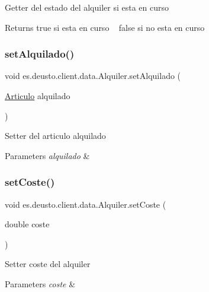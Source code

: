 Getter del estado del alquiler si esta en curso \begin{DoxyReturn}{Returns}
true si esta en curso ~\newline
 false si no esta en curso 
\end{DoxyReturn}
\mbox{\label{classes_1_1deusto_1_1client_1_1data_1_1_alquiler_aba93732bce43b85bb3d48b58f0f7c2de}} 
\subsubsection{\texorpdfstring{setAlquilado()}{setAlquilado()}}
{\footnotesize\ttfamily void es.\+deusto.\+client.\+data.\+Alquiler.\+set\+Alquilado (\begin{DoxyParamCaption}\item[{\mbox{\hyperlink{classes_1_1deusto_1_1client_1_1data_1_1_articulo}{Articulo}}}]{alquilado }\end{DoxyParamCaption})}

Setter del articulo alquilado 
\begin{DoxyParams}{Parameters}
{\em alquilado} & \\
\hline
\end{DoxyParams}
\mbox{\label{classes_1_1deusto_1_1client_1_1data_1_1_alquiler_ac00f76e51f97fe13f2b2c399146bb14f}} 
\subsubsection{\texorpdfstring{setCoste()}{setCoste()}}
{\footnotesize\ttfamily void es.\+deusto.\+client.\+data.\+Alquiler.\+set\+Coste (\begin{DoxyParamCaption}\item[{double}]{coste }\end{DoxyParamCaption})}

Setter coste del alquiler 
\begin{DoxyParams}{Parameters}
{\em coste} & \\
\hline
\end{DoxyParams}
\mbox{\label{classes_1_1deusto_1_1client_1_1data_1_1_alquiler_a1910a30f5dcf4fbecd4766704f8bd116}} 

